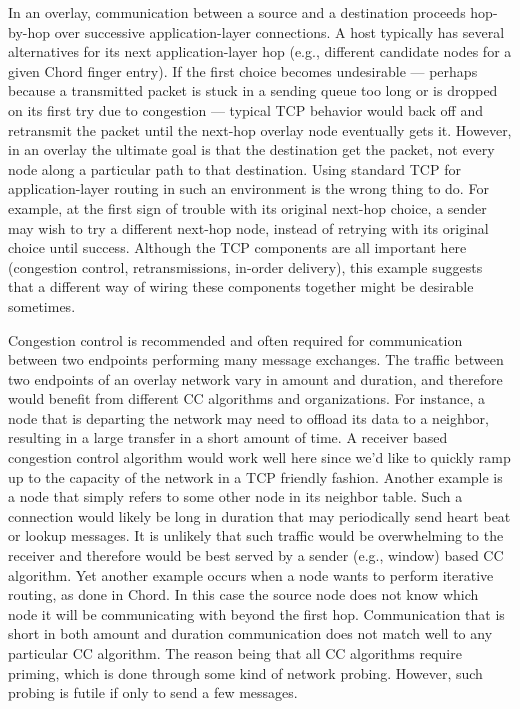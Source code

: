 
In an overlay, communication
between a source and a destination proceeds hop-by-hop over successive
application-layer connections.  A host typically has several
alternatives for its next application-layer hop (e.g., different
candidate nodes for a given Chord finger entry).  If the first choice
becomes undesirable --- perhaps because a transmitted packet is stuck in
a sending queue too long or is dropped on its first try due to
congestion --- typical TCP behavior would back off and retransmit the
packet until the next-hop overlay node eventually gets it.  However, in
an overlay the ultimate goal is that the destination get the packet, not
every node along a particular path to that destination.  Using standard
TCP for application-layer routing in such an environment is the wrong
thing to do.  For example, at the first sign of trouble with its
original next-hop choice, a sender may wish to try a different next-hop
node, instead of retrying with its original choice until success.
Although the TCP components are all important here (congestion control,
retransmissions, in-order delivery), this example suggests that a
different way of wiring these components together might be desirable
sometimes.

 Congestion control is recommended and
often required for communication between two endpoints performing 
many message exchanges. The traffic between two endpoints of an overlay 
network vary in amount and duration, and therefore would benefit from different
CC algorithms and organizations. For instance, a node that is departing
the network may need to offload its data to a neighbor, resulting in a large 
transfer in a short amount of time. A receiver based congestion control algorithm
would work well here since we'd like to quickly ramp up to the capacity of the 
network in a TCP friendly fashion. Another example is a node that simply refers 
to some other node in its neighbor table. Such a connection would likely be 
long in duration that may periodically send heart beat or lookup messages. 
It is unlikely that such traffic would be overwhelming to the receiver and therefore
would be best served by a sender (e.g., window) based CC algorithm. Yet 
another example occurs when a node wants to perform iterative routing, as done 
in Chord. In this case the source node does not know which node it will be
communicating with beyond the first hop. Communication that is short in both
amount and duration communication does not match well to any particular CC 
algorithm. The reason being that all CC algorithms require priming, which is
done through some kind of network probing. However, such probing is futile if
only to send a few messages. 

